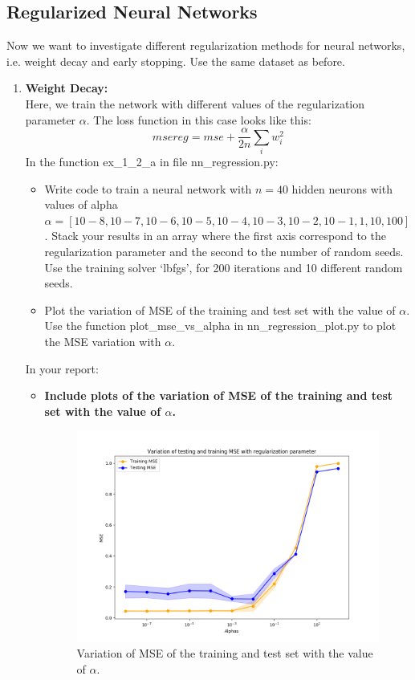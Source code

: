 \documentclass[a4paper]{article}
\begin{document}
\subsection{Regularized Neural Networks}
Now we want to investigate different regularization methods for neural networks, i.e. weight decay and early stopping. Use the same dataset as before.

\begin{enumerate}[label=(\alph*)]
	\item \textbf{Weight Decay:}\\
    Here, we train the network with different values of the regularization parameter $\alpha$. The loss function in this case looks like this:
    \[
    	msereg = mse + \frac{\alpha}{2n}\sum_i w_i^2
    \]
    In the function ex\_1\_2\_a in file nn\_regression.py:
    \begin{itemize}
        \item Write code to train a neural network with $n = 40$ hidden neurons with values of alpha $\alpha = [10−8, 10−7, 10−6, 10−5, 10−4, 10−3, 10−2, 10−1, 1, 10, 100]$. Stack your results in an array where the first axis correspond to the regularization parameter and the second to the number of random seeds. Use the training solver ‘lbfgs’, for 200 iterations and 10 different random seeds.
        \item Plot the variation of MSE of the training and test set with the value of $\alpha$. Use the function plot\_mse\_vs\_alpha in nn\_regression\_plot.py to plot the MSE variation with $\alpha$.
    \end{itemize}
In your report:
\begin{itemize}
\item \textbf{Include plots of the variation of MSE of the training and test set with the value of $\alpha$.}

\begin{figure}[htp]
  \centering
  \includegraphics[scale=0.50]{plots/12a.png}        \caption{Variation of MSE of the training and test set with the value of $\alpha$.}
  \label{fig:12a}
\end{figure}


\end{itemize}
\end{enumerate}
\end{document}

